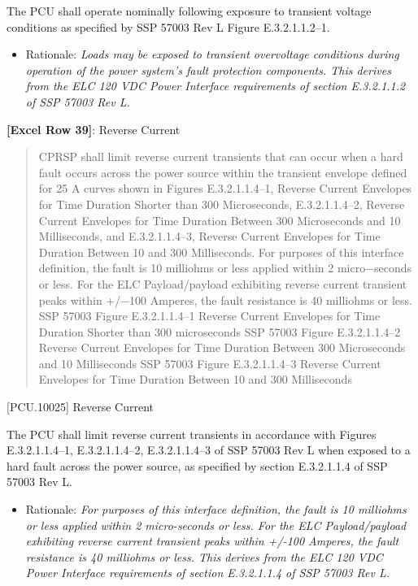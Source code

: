 The PCU shall operate nominally following exposure to transient voltage conditions as specified by SSP 57003 Rev L Figure E.3.2.1.1.2--1.

\begin{itemize}
\item{} Rationale: \emph{Loads may be exposed to transient overvoltage conditions during operation of the power system's fault protection components. This derives from the ELC 120 VDC Power Interface requirements of section E.3.2.1.1.2 of SSP 57003 Rev L.}

\end{itemize}

\textbf{[Excel Row 39]}: Reverse Current

\begin{quote}
CPRSP shall limit reverse current transients that can occur when a hard fault occurs across the power source within the transient envelope defined for 25 A curves shown in Figures E.3.2.1.1.4--1, Reverse Current Envelopes for Time Duration Shorter than 300 Microseconds, E.3.2.1.1.4--2, Reverse Current Envelopes for Time Duration Between 300 Microseconds and 10 Milliseconds, and E.3.2.1.1.4--3, Reverse Current Envelopes for Time Duration Between 10 and 300 Milliseconds.
For purposes of this interface definition, the fault is 10 milliohms or less applied within 2 micro−seconds or less. For the ELC Payload\slash payload exhibiting reverse current transient peaks within +\slash −100 Amperes, the fault resistance is 40 milliohms or less.
SSP 57003 Figure E.3.2.1.1.4--1 Reverse Current Envelopes for Time Duration Shorter than 300 microseconds
SSP 57003 Figure E.3.2.1.1.4--2 Reverse Current Envelopes for Time Duration Between 300 Microseconds and 10 Milliseconds
SSP 57003 Figure E.3.2.1.1.4--3 Reverse Current Envelopes for Time Duration Between 10 and 300 Milliseconds
\end{quote}

[PCU.10025] Reverse Current

The PCU shall limit reverse current transients in accordance with Figures E.3.2.1.1.4--1, E.3.2.1.1.4--2, E.3.2.1.1.4--3 of SSP 57003 Rev L when exposed to a hard fault across the power source, as specified by section E.3.2.1.1.4 of SSP 57003 Rev L.

\begin{itemize}
\item{} Rationale: \emph{For purposes of this interface definition, the fault is 10 milliohms or less applied within 2 micro-seconds or less. For the ELC Payload\slash payload exhibiting reverse current transient peaks within +\slash -100 Amperes, the fault resistance is 40 milliohms or less. This derives from the ELC 120 VDC Power Interface requirements of section E.3.2.1.1.4 of SSP 57003 Rev L.}

\end{itemize}

